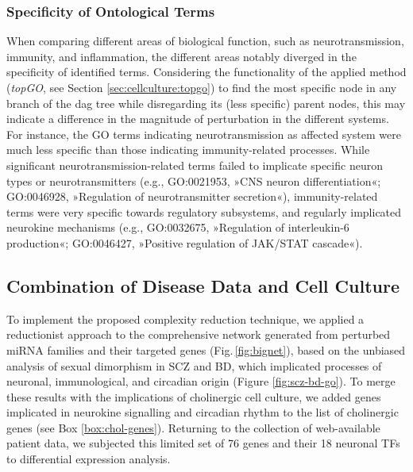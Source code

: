 \subsubsection{Specificity of Ontological Terms}
When comparing different areas of biological function, such as neurotransmission, immunity, and inflammation, the different areas notably diverged in the specificity of identified terms. Considering the functionality of the applied method (\emph{topGO}, see Section \ref{sec:cellculture:topgo}) to find the most specific node in any branch of the \ac{dag} tree while disregarding its (less specific) parent nodes, this may indicate a difference in the magnitude of perturbation in the different systems. For instance, the GO terms indicating neurotransmission as affected system were much less specific than those indicating immunity-related processes. While significant neurotransmission-related terms failed to implicate specific neuron types or neurotransmitters (e.g., GO:0021953, »CNS neuron differentiation«; GO:0046928, »Regulation of neurotransmitter secretion«), immunity-related terms were very specific towards regulatory subsystems, and regularly implicated neurokine mechanisms (e.g., GO:0032675, »Regulation of interleukin-6 production«; GO:0046427, »Positive regulation of JAK/STAT cascade«).

\subsection{Combination of Disease Data and Cell Culture}
To implement the proposed complexity reduction technique, we applied a reductionist approach to the comprehensive network generated from perturbed miRNA families and their targeted genes (Fig.\,\ref{fig:bignet}), based on the unbiased analysis of sexual dimorphism in SCZ and BD, which implicated processes of neuronal, immunological, and circadian origin (Figure \ref{fig:scz-bd-go}). To merge these results with the implications of cholinergic cell culture, we added genes implicated in neurokine signalling and circadian rhythm to the list of cholinergic genes (see Box \ref{box:chol-genes}). Returning to the collection of web-available patient data, we subjected this limited set of 76 genes and their 18 neuronal TFs to differential expression analysis.

